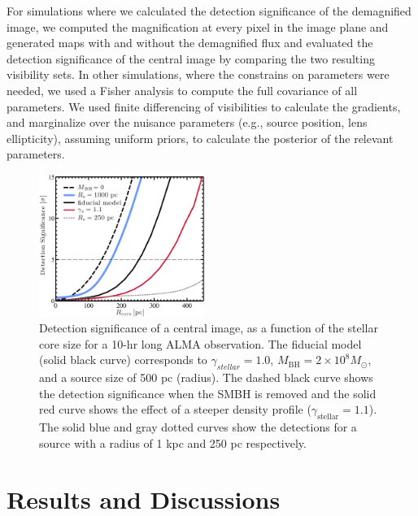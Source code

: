 \documentclass[chicago]{emulateapj}
\begin{document}
For simulations where we calculated the detection significance of the demagnified image, we computed the magnification at every pixel in the image plane and generated maps with and without the demagnified flux and evaluated the detection significance of the central image by comparing the two resulting visibility sets. In other simulations, where the constrains on parameters were needed, we used a Fisher analysis to compute the full covariance of all parameters. 
We used finite differencing of visibilities to calculate the gradients, and marginalize over the nuisance parameters (e.g., source position, lens ellipticity), assuming uniform priors, to calculate the posterior of the relevant parameters. 





\begin{figure}
\begin{center}
\centering
\includegraphics[trim= 0 0 0 0, clip,width=0.48\textwidth]{figures/f_03.eps}
\centering
\end{center}
\caption{ Detection significance of a central image, as a function of the stellar core size for a 10-hr long ALMA observation. 
The fiducial model (solid black curve) corresponds to $\gamma_{stellar}=1.0$, $M_{\mathrm{BH}}=2\times10^8 M_{\odot}$, and a source size of 500 pc (radius). The dashed black curve shows the detection significance when the SMBH is removed and the solid red curve shows the effect of a steeper density profile ($\gamma_{\mathrm{stellar}}=1.1$). The solid blue and gray dotted curves show the detections for a source with a radius of 1 kpc and 250 pc respectively. 
\label{fig:3}}
\end{figure}

\section{Results and Discussions}
\end{document}
